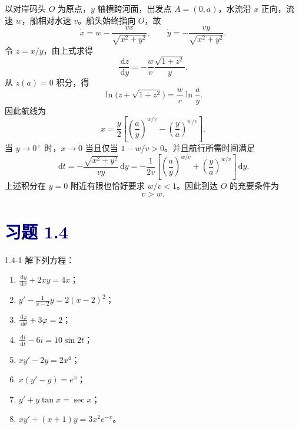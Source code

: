 \documentclass[UTF8,a4paper,11pt]{ctexart}
\newcommand{\dd}{\,\mathrm d}
\newcommand{\sect}[1]{\section*{\textcolor{navy}{习题 #1}}}
\begin{document}
\begin{solution}
以对岸码头 $O$ 为原点，$y$ 轴横跨河面，出发点 $A=(0,a)$，水流沿 $x$ 正向，流速 $w$，船相对水速 $v$。船头始终指向 $O$，故
\[
\dot x=w-\frac{vx}{\sqrt{x^2+y^2}},\qquad
\dot y=-\frac{vy}{\sqrt{x^2+y^2}}.
\]
令 $z=x/y$，由上式求得
\[
\frac{\dd z}{\dd y}=-\frac{w}{v}\frac{\sqrt{1+z^2}}{y}.
\]
从 $z(a)=0$ 积分，得
\[
\ln\!\bigl(z+\sqrt{1+z^2}\bigr)=\frac wv\ln\frac ay.
\]
因此航线为
\[
\boxed{x=\frac y2\left[\left(\frac ay\right)^{w/v}-\left(\frac ya\right)^{w/v}\right]}.
\]
当 $y\to0^+$ 时，$x\to0$ 当且仅当 $1-w/v>0$。并且航行所需时间满足
\[
\dd t=-\frac{\sqrt{x^2+y^2}}{vy}\dd y
=-\frac1{2v}\left[\left(\frac ay\right)^{w/v}
+\left(\frac ya\right)^{w/v}\right]\dd y .
\]
上述积分在 $y=0$ 附近有限也恰好要求 $w/v<1$。因此到达 $O$ 的充要条件为
\[
\boxed{v>w}.
\]
\end{solution}


\sect{1.4}
\begin{problem}{1.4-1}
解下列方程：
  \begin{enumerate}[label=(\arabic*)]
    \item $\displaystyle \frac{\dd y}{\dd x}+2xy=4x$；
    \item $\displaystyle y'-\frac{1}{x-2}y=2(x-2)^2$；
    \item $\displaystyle \frac{\dd\varphi}{\dd\theta}+3\varphi=2$；
    \item $\displaystyle \frac{\dd i}{\dd t}-6i=10\sin 2t$；
    \item $\displaystyle xy'-2y=2x^4$；
    \item $\displaystyle x(y'-y)=e^x$；
    \item $\displaystyle y'+y\tan x=\sec x$；
    \item $\displaystyle xy'+(x+1)y=3x^2e^{-x}$。
  \end{enumerate}
\end{problem}
\end{document}

